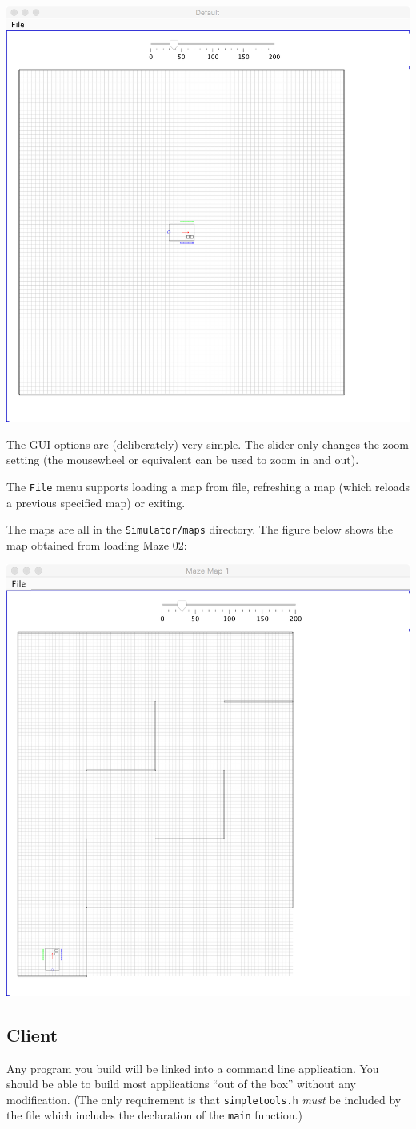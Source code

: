 \documentclass[a4paper]{article}
\begin{document}
\begin{center}
\includegraphics[width=0.5\linewidth]{default_scenario.png}
\end{center}

The GUI options are (deliberately) very simple. The slider only changes the zoom setting (the mousewheel or equivalent can be used to zoom in and out).

The \verb+File+ menu supports loading a map from file, refreshing a map (which reloads a previous specified map) or exiting.

The maps are all in the \verb+Simulator/maps+ directory. The figure below shows the map obtained from loading Maze 02:

\begin{center}
\includegraphics[width=0.5\linewidth]{Maze_Map01.png}
\end{center}

\subsection*{Client}

Any program you build will be linked into a command line application. You should be able to build most applications ``out of the box'' without any modification. (The only requirement is that \verb+simpletools.h+ \emph{must\/} be included by the file which includes the declaration of the \verb+main+ function.)
\end{document}
